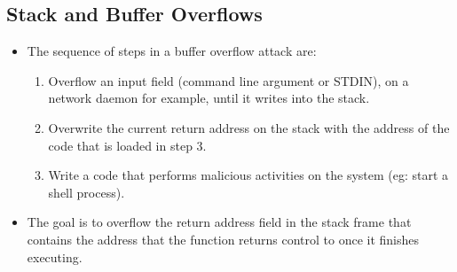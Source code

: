 \documentclass{article}
\theoremstyle{plain}
\theoremstyle{definition}
\begin{document}
\subsection{Stack and Buffer Overflows}
\begin{itemize}
    \item The sequence of steps in a buffer overflow attack are:
    \begin{enumerate}
        \item Overflow an input field (command line argument or STDIN), on a network daemon for example, until it writes into the stack. 
        
        \item Overwrite the current return address on the stack with the address of the code that is loaded in step 3. 
        
        \item Write a code that performs malicious activities on the system (eg: start a shell process). 
    \end{enumerate}
    
    \item The goal is to overflow the return address field in the stack frame that contains the address that the function returns control to once it finishes executing. 
\end{itemize}
\end{document}

